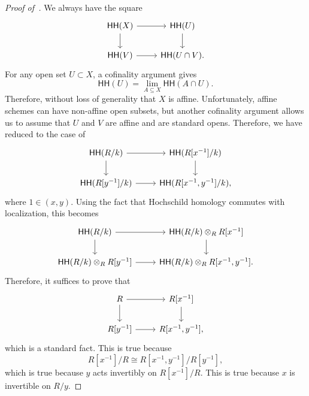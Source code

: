 \documentclass[10pt, oneside]{memoir}
\theoremstyle{definition}
\theoremstyle{remark}
\theoremstyle{plain}
\theoremstyle{definition}
\theoremstyle{remark}
\newcommand{\ms}[1]{\mathsf{#1}}
\newcommand{\1}{\mathbf{1}}
\newcommand{\2}{\mathbf{2}}
\newcommand{\3}{\mathbf{3}}
\newcommand{\HH}{\ms{HH}}
\begin{document}
\begin{proof}[Proof of~]
    We always have the square
    \begin{equation*}
        \begin{tikzcd}
            \HH(X) \ar{r} \ar{d} & \HH(U) \ar{d} \\
            \HH(V) \ar{r} & \HH(U \cap V).
        \end{tikzcd}
        \end{equation*}
        For any open set \(U \subset X \), a cofinality argument gives
        \[ \HH(U) = \lim_{A \subseteq X} \HH(A \cap U). \]
        Therefore, without loss of generality that \(X \) is affine. Unfortunately, affine schemes can have non-affine open subsets, but another cofinality argument allows us to assume that \(U \) and \(V \) are affine and are standard opens. Therefore, we have reduced to the case of
        \begin{equation*}
        \begin{tikzcd}
            \HH(R/k) \ar{r} \ar{d} & \HH(R[x^{-1}]/k) \ar{d} \\
            \HH(R[y^{-1}]/k) \ar{r} & \HH(R[x^{-1}, y^{-1}]/k),
        \end{tikzcd}
        \end{equation*}
        where \(1 \in (x,y) \). Using the fact that Hochschild homology commutes with localization, this becomes
        \begin{equation*}
            \begin{tikzcd}
                \HH(R/k) \ar{r} \ar{d} & \HH(R/k) \otimes_R R[x^{-1}] \ar{d} \\
                \HH(R/k) \otimes_R R[y^{-1}] \ar{r} & \HH(R/k) \otimes_R R[x^{-1}, y^{-1}].
            \end{tikzcd}
        \end{equation*}
        Therefore, it suffices to prove that
        \begin{equation*}
        \begin{tikzcd}
            R \ar{r} \ar{d} & R[x^{-1}] \ar{d} \\
            R[y^{-1}] \ar{r} & R[x^{-1}, y^{-1}],
        \end{tikzcd}
        \end{equation*}
        which is a standard fact. This is true because
        \[ R[x^{-1}]/R \cong R[x^{-1}, y^{-1}]/ R[y^{-1}], \]
        which is true because \(y \) acts invertibly on \(R[x^{-1}]/R \). This is true because \(x \) is invertible on \(R/y \).
\end{proof}
\end{document}
